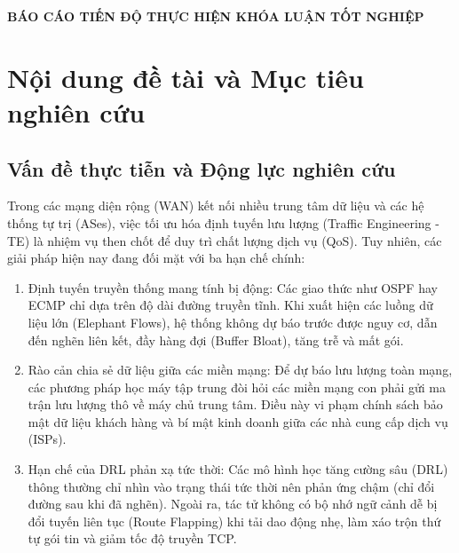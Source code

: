 \documentclass[11pt,a4paper]{article}
\begin{document}

\begin{center}
    {\Large\bfseries BÁO CÁO TIẾN ĐỘ THỰC HIỆN KHÓA LUẬN TỐT NGHIỆP}
\end{center}

\vspace{0.4cm}
\section{Nội dung đề tài và Mục tiêu nghiên cứu}

\subsection{Vấn đề thực tiễn và Động lực nghiên cứu}
Trong các mạng diện rộng (WAN) kết nối nhiều trung tâm dữ liệu và các hệ thống tự trị (ASes), việc tối ưu hóa định tuyến lưu lượng (Traffic Engineering - TE) là nhiệm vụ then chốt để duy trì chất lượng dịch vụ (QoS). Tuy nhiên, các giải pháp hiện nay đang đối mặt với ba hạn chế chính:
\begin{enumerate}[leftmargin=1.5em, itemsep=0.2ex]
    \item Định tuyến truyền thống mang tính bị động: Các giao thức như OSPF hay ECMP chỉ dựa trên độ dài đường truyền tĩnh. Khi xuất hiện các luồng dữ liệu lớn (Elephant Flows), hệ thống không dự báo trước được nguy cơ, dẫn đến nghẽn liên kết, đầy hàng đợi (Buffer Bloat), tăng trễ và mất gói.
    \item Rào cản chia sẻ dữ liệu giữa các miền mạng: Để dự báo lưu lượng toàn mạng, các phương pháp học máy tập trung đòi hỏi các miền mạng con phải gửi ma trận lưu lượng thô về máy chủ trung tâm. Điều này vi phạm chính sách bảo mật dữ liệu khách hàng và bí mật kinh doanh giữa các nhà cung cấp dịch vụ (ISPs).
    \item Hạn chế của DRL phản xạ tức thời: Các mô hình học tăng cường sâu (DRL) thông thường chỉ nhìn vào trạng thái tức thời nên phản ứng chậm (chỉ đổi đường sau khi đã nghẽn). Ngoài ra, tác tử không có bộ nhớ ngữ cảnh dễ bị đổi tuyến liên tục (Route Flapping) khi tải dao động nhẹ, làm xáo trộn thứ tự gói tin và giảm tốc độ truyền TCP.
\end{enumerate}
\end{document}

